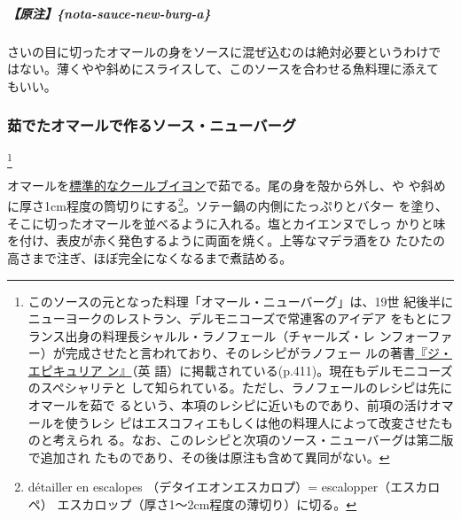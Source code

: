 \begin{recette}
\hypertarget{ux539fux6ce8nota-sauce-new-burg-a}{%
\subparagraph{【原注】\{nota-sauce-new-burg-a\}}\label{ux539fux6ce8nota-sauce-new-burg-a}}

さいの目に切ったオマールの身をソースに混ぜ込むのは絶対必要というわけで
はない。薄くやや斜めにスライスして、このソースを合わせる魚料理に添えて
もいい。

\maeaki

\hypertarget{sauce-new-burg-avec-le-homard-cuit}{%
\subsubsection{茹でたオマールで作るソース・ニューバーグ}\label{sauce-new-burg-avec-le-homard-cuit}}

\footnote{このソースの元となった料理「オマール・ニューバーグ」は、19世
  紀後半にニューヨークのレストラン、デルモニコーズで常連客のアイデア
  をもとにフランス出身の料理長シャルル・ラノフェール（チャールズ・レ
  ンフォーファー）が完成させたと言われており、そのレシピがラノフェー
  ルの著書\href{https://archive.org/details/epicureancomplet00ranhrich}{『ジ・エピキュリア
  ン』}（英
  語）に掲載されている(p.411)。現在もデルモニコーズのスペシャリテと
  して知られている。ただし、ラノフェールのレシピは先にオマールを茹で
  るという、本項のレシピに近いものであり、前項の活けオマールを使うレシ
  ピはエスコフィエもしくは他の料理人によって改変させたものと考えられ
  る。なお、このレシピと次項のソース・ニューバーグは第二版で追加され
  たものであり、その後は原注も含めて異同がない。}


オマールを\protect\hyperlink{court-bouillon-e}{標準的なクールブイヨン}で茹でる。尾の身を殻から外し、や
や斜めに厚さ1cm程度の筒切りにする\footnote{détailler en escalopes
  （デタイエオンエスカロプ）= escalopper（エスカロペ）
  エスカロップ（厚さ1〜2cm程度の薄切り）に切る。}。ソテー鍋の内側にたっぷりとバター
を塗り、そこに切ったオマールを並べるように入れる。塩とカイエンヌでしっ
かりと味を付け、表皮が赤く発色するように両面を焼く。上等なマデラ酒をひ
たひたの高さまで注ぎ、ほぼ完全になくなるまで煮詰める。


\end{recette}
